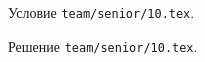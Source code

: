 \problem{}
Условие \texttt{team/senior/10.tex}.

\solution Решение \texttt{team/senior/10.tex}.
\endproblem
